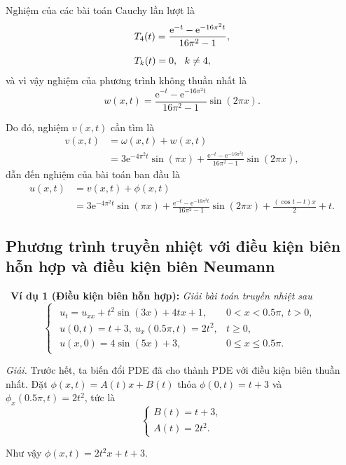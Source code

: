 \documentclass[10pt, a4paper]{article}
\begin{document}
	Nghiệm của các bài toán Cauchy lần lượt là \begin{align*}
		&T_4(t)=\frac{\mathrm e^{-t}-\mathrm e^{-16\pi^2t}}{16\pi^2-1},\\
		\noalign{\vskip5pt}
		&T_k(t)=0,~~k\ne4,
	\end{align*}
	và vì vậy nghiệm của phương trình không thuần nhất là $$w(x,t)=\frac{\mathrm e^{-t}-\mathrm e^{-16\pi^2t}}{16\pi^2-1}\sin(2\pi x).$$
	
	Do đó, nghiệm $v(x,t)$ cần tìm là \begin{align*}
		v(x,t)&=\omega(x,t)+w(x,t)\\
		&=3\mathrm e^{-4\pi^2t}\sin(\pi x)+\frac{\mathrm e^{-t}-\mathrm e^{-16\pi^2t}}{16\pi^2-1}\sin(2\pi x),
	\end{align*}
	dẫn đến nghiệm của bài toán ban đầu là \begin{align*}
		u(x,t)&=v(x,t)+\phi(x,t)\\
		&=3\mathrm e^{-4\pi^2t}\sin(\pi x)+\frac{\mathrm e^{-t}-\mathrm e^{-16\pi^2t}}{16\pi^2-1}\sin(2\pi x)+\frac{(\cos t-t)x}{2}+t.
	\end{align*}
	\subsection{Phương trình truyền nhiệt với điều kiện biên hỗn hợp và điều kiện biên Neumann}
	\quad\,\,\,\textbf{Ví dụ 1 (Điều kiện biên hỗn hợp):} \textit{Giải bài toán truyền nhiệt sau} $$\begin{cases}
		\begin{array}{ll}
			u_t=u_{xx}+t^2\sin(3x)+4tx+1, & 0<x<0.5\pi,~t>0,\\
			u(0,t)=t+3,~u_x(0.5\pi,t)=2t^2, & t\ge0,\\
			u(x,0)=4\sin(5x)+3, & 0\le x\le 0.5\pi.
		\end{array}
	\end{cases}$$
	
	\textit{Giải.} Trước hết, ta biến đổi PDE đã cho thành PDE với điều kiện biên thuần nhất. Đặt $\phi(x,t)=A(t)x+B(t)$ thỏa $\phi(0,t)=t+3$ và $\phi_x(0.5\pi,t)=2t^2$, tức là $$\begin{cases}
		B(t)=t+3,\\
		A(t)=2t^2.
	\end{cases}$$
	
	Như vậy $\phi(x,t)=2t^2x+t+3$.\\
	
\end{document}
